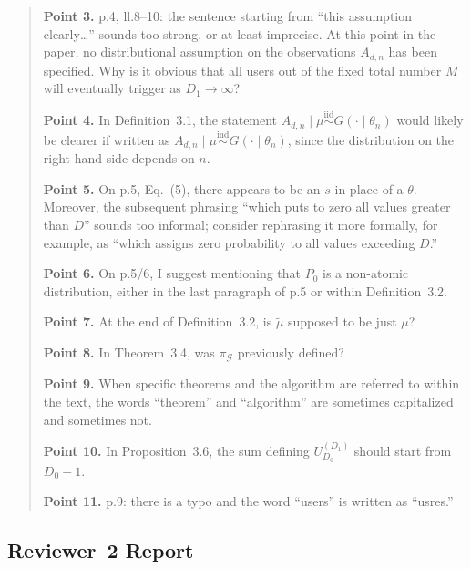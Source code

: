 \begin{quote}
\medskip
\textbf{Point 3.}
p.4, ll.8--10: the sentence starting from ``this assumption
clearly\ldots'' sounds too strong, or at least imprecise. At this
point in the paper, no distributional assumption on the observations
$A_{d,n}$ has been specified. Why is it obvious that all users out of
the fixed total number $M$ will eventually trigger as $D_1 \to \infty$?

\medskip
\textbf{Point 4.}
In Definition~3.1, the statement
$A_{d,n} \mid \mu \stackrel{\mathrm{iid}}{\sim} G(\cdot \mid \theta_n)$
would likely be clearer if written as
$A_{d,n} \mid \mu \stackrel{\mathrm{ind}}{\sim} G(\cdot \mid \theta_n)$,
since the distribution on the right-hand side depends on $n$.

\medskip
\textbf{Point 5.}
On p.5, Eq.~(5), there appears to be an $s$ in place of a $\theta$.
Moreover, the subsequent phrasing ``which puts to zero all values
greater than $D$'' sounds too informal; consider rephrasing it more
formally, for example, as ``which assigns zero probability to all
values exceeding $D$.''

\medskip
\textbf{Point 6.}
On p.5/6, I suggest mentioning that $P_0$ is a non-atomic
distribution, either in the last paragraph of p.5 or within
Definition~3.2.

\medskip
\textbf{Point 7.}
At the end of Definition~3.2, is $\tilde\mu$ supposed to be just $\mu$?

\medskip
\textbf{Point 8.}
In Theorem~3.4, was $\pi_{\mathcal{G}}$ previously defined?

\medskip
\textbf{Point 9.}
When specific theorems and the algorithm are referred to within the
text, the words ``theorem'' and ``algorithm'' are sometimes
capitalized and sometimes not.

\medskip
\textbf{Point 10.}
In Proposition~3.6, the sum defining $U_{D_0}^{(D_1)}$ should start
from $D_0 + 1$.

\medskip
\textbf{Point 11.}
p.9: there is a typo and the word ``users'' is written as ``usres.''
\end{quote}


\subsection{Reviewer~2 Report}
\label{app:r2}

